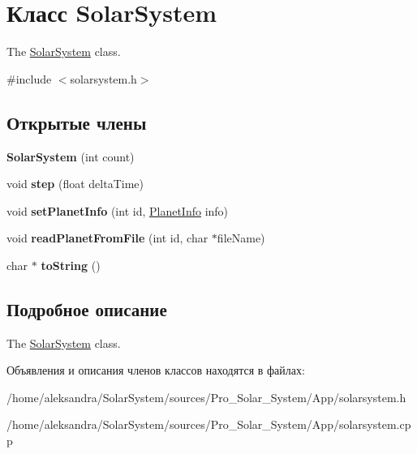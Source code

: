 \hypertarget{classSolarSystem}{\section{Класс Solar\-System}
\label{classSolarSystem}
}


The \hyperlink{classSolarSystem}{Solar\-System} class.  




{\ttfamily \#include $<$solarsystem.\-h$>$}

\subsection*{Открытые члены}
\begin{DoxyCompactItemize}
\item 
\hypertarget{classSolarSystem_aa8f9904b7bdb87c678dd37045f0ebe37}{{\bfseries Solar\-System} (int count)}\label{classSolarSystem_aa8f9904b7bdb87c678dd37045f0ebe37}

\item 
\hypertarget{classSolarSystem_ae6dfcae474f4f5bd792f9adf8875a133}{void {\bfseries step} (float delta\-Time)}\label{classSolarSystem_ae6dfcae474f4f5bd792f9adf8875a133}

\item 
\hypertarget{classSolarSystem_af45cf97f5d4c04e074c7e14af8ded0d1}{void {\bfseries set\-Planet\-Info} (int id, \hyperlink{classPlanetInfo}{Planet\-Info} info)}\label{classSolarSystem_af45cf97f5d4c04e074c7e14af8ded0d1}

\item 
\hypertarget{classSolarSystem_a536f13a753fb517694968a0fb7f0ea53}{void {\bfseries read\-Planet\-From\-File} (int id, char $\ast$file\-Name)}\label{classSolarSystem_a536f13a753fb517694968a0fb7f0ea53}

\item 
\hypertarget{classSolarSystem_a3e5c9b84f09493e68fd84c6fb8d539b6}{char $\ast$ {\bfseries to\-String} ()}\label{classSolarSystem_a3e5c9b84f09493e68fd84c6fb8d539b6}

\end{DoxyCompactItemize}


\subsection{Подробное описание}
The \hyperlink{classSolarSystem}{Solar\-System} class. 

Объявления и описания членов классов находятся в файлах\-:\begin{DoxyCompactItemize}
\item 
/home/aleksandra/\-Solar\-System/sources/\-Pro\-\_\-\-Solar\-\_\-\-System/\-App/solarsystem.\-h\item 
/home/aleksandra/\-Solar\-System/sources/\-Pro\-\_\-\-Solar\-\_\-\-System/\-App/solarsystem.\-cpp\end{DoxyCompactItemize}
